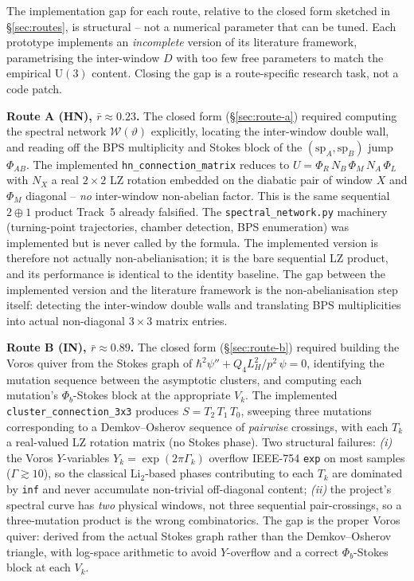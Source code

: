 \documentclass[11pt]{article}
\begin{document}
The implementation gap for each route, relative to the closed form
sketched in \S\ref{sec:routes}, is structural -- not a numerical
parameter that can be tuned. Each prototype implements an
\emph{incomplete} version of its literature framework, parametrising
the inter-window $D$ with too few free parameters to match the
empirical $\mathrm U(3)$ content. Closing the gap is a route-specific
research task, not a code patch.

\textbf{Route A (HN), $\bar r\approx 0.23$.} The closed form
(\S\ref{sec:route-a}) required computing the spectral network
$\mathcal W(\vartheta)$ explicitly, locating the inter-window double
wall, and reading off the BPS multiplicity and Stokes block of the
$(\mathrm{sp}_A,\mathrm{sp}_B)$ jump $\Phi_{AB}$. The implemented
\texttt{hn\_connection\_matrix} reduces to
$U = \Phi_R\,N_B\,\Phi_M\,N_A\,\Phi_L$ with $N_X$ a real $2\times2$
LZ rotation embedded on the diabatic pair of window $X$ and $\Phi_M$
diagonal -- \emph{no} inter-window non-abelian factor. This is the same
sequential $2\oplus 1$ product Track~5 already falsified. The
\texttt{spectral\_network.py} machinery (turning-point trajectories,
chamber detection, BPS enumeration) was implemented but is never
called by the formula. The implemented version is therefore not
actually non-abelianisation; it is the bare sequential LZ product,
and its performance is identical to the identity baseline. The gap
between the implemented version and the literature framework is the
non-abelianisation step itself: detecting the inter-window double
walls and translating BPS multiplicities into actual non-diagonal
$3\times3$ matrix entries.

\textbf{Route B (IN), $\bar r\approx 0.89$.} The closed form
(\S\ref{sec:route-b}) required building the Voros quiver from the
Stokes graph of $\hbar^2\psi'' + Q_4 L_H^2/p^2\,\psi=0$, identifying the
mutation sequence between the asymptotic clusters, and computing
each mutation's $\Phi_b$-Stokes block at the appropriate $V_k$. The
implemented \texttt{cluster\_connection\_3x3} produces
$S = T_2\,T_1\,T_0$, sweeping three mutations corresponding to a
Demkov--Osherov sequence of \emph{pairwise} crossings, with each
$T_k$ a real-valued LZ rotation matrix (no Stokes phase). Two
structural failures: \emph{(i)} the Voros $Y$-variables
$Y_k = \exp(2\pi\Gamma_k)$ overflow IEEE-754 \texttt{exp} on most
samples ($\Gamma\gtrsim 10$), so the classical $\mathrm{Li}_2$-based
phases contributing to each $T_k$ are dominated by \texttt{inf} and
never accumulate non-trivial off-diagonal content; \emph{(ii)} the
project's spectral curve has \emph{two} physical windows, not three
sequential pair-crossings, so a three-mutation product is the wrong
combinatorics. The gap is the proper Voros quiver: derived from the
actual Stokes graph rather than the Demkov--Osherov triangle, with
log-space arithmetic to avoid $Y$-overflow and a correct
$\Phi_b$-Stokes block at each $V_k$.
\end{document}
